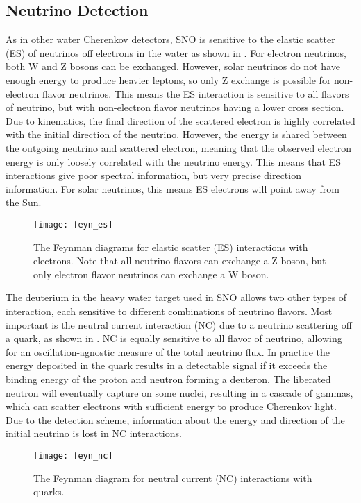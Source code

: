 \subsection{Neutrino Detection}

As in other water Cherenkov detectors, SNO is sensitive to the elastic scatter (ES) of neutrinos off electrons in the water as shown in .
For electron neutrinos, both W and Z bosons can be exchanged.
However, solar neutrinos do not have enough energy to produce heavier leptons, so only Z exchange is possible for non-electron flavor neutrinos.
This means the ES interaction is sensitive to all flavors of neutrino, but with non-electron flavor neutrinos having a lower cross section.
Due to kinematics, the final direction of the scattered electron is highly correlated with the initial direction of the neutrino.
However, the energy is shared between the outgoing neutrino and scattered electron, meaning that the observed electron energy is only loosely correlated with the neutrino energy.
This means that ES interactions give poor spectral information, but very precise direction information.
For solar neutrinos, this means ES electrons will point away from the Sun.

\begin{figure}
\centering
\texttt{[image: feyn\_es]}
\caption{\label{fig:ES}The Feynman diagrams for elastic scatter (ES) interactions with electrons. 
Note that all neutrino flavors can exchange a Z boson, but only electron flavor neutrinos can exchange a W boson.}
\end{figure}

The deuterium in the heavy water target used in SNO allows two other types of interaction, each sensitive to different combinations of neutrino flavors.
Most important is the neutral current interaction (NC) due to a neutrino scattering off a quark, as shown in .
NC is equally sensitive to all flavor of neutrino, allowing for an oscillation-agnostic measure of the total neutrino flux.
In practice the energy deposited in the quark results in a detectable signal if it exceeds the binding energy of the proton and neutron forming a deuteron.
The liberated neutron will eventually capture on some nuclei, resulting in a cascade of gammas, which can scatter electrons with sufficient energy to produce Cherenkov light.
Due to the detection scheme, information about the energy and direction of the initial neutrino is lost in NC interactions.

\begin{figure}
\centering
\texttt{[image: feyn\_nc]}
\caption{\label{fig:NC}The Feynman diagram for neutral current (NC) interactions with quarks.}
\end{figure}

